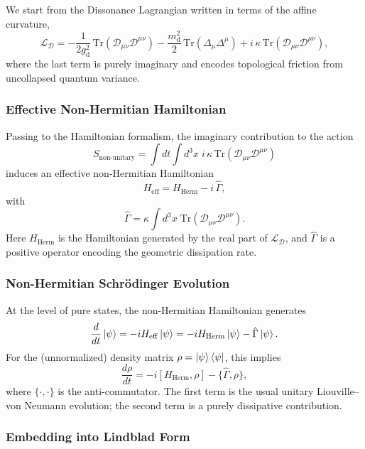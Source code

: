 \documentclass[12pt,openany]{book}
\theoremstyle{plain}
\theoremstyle{definition}
\theoremstyle{remark}
\begin{document}
We start from the Dissonance Lagrangian written in terms of the affine
curvature,
\[
\mathcal{L}_{\mathcal{D}}
=
-\frac{1}{2 g_{\mathrm{d}}^{2}}
\,\mathrm{Tr}\!\left(\mathcal{D}_{\mu\nu}\mathcal{D}^{\mu\nu}\right)
-\frac{m_{\mathrm{d}}^{2}}{2}
\,\mathrm{Tr}\!\left(\Delta_\mu \Delta^\mu\right)
+i\,\kappa\,\mathrm{Tr}\!\left(\mathcal{D}_{\mu\nu}\mathcal{D}^{\mu\nu}\right),
\]
where the last term is purely imaginary and encodes topological friction
from uncollapsed quantum variance.

\subsubsection*{Effective Non-Hermitian Hamiltonian}

Passing to the Hamiltonian formalism, the imaginary contribution to the
action
\[
S_{\mathrm{non\text{-}unitary}}
= \int dt \int d^3x\;
  i\,\kappa\,\mathrm{Tr}\!\left(\mathcal{D}_{\mu\nu}\mathcal{D}^{\mu\nu}\right)
\]
induces an effective non-Hermitian Hamiltonian
\[
H_{\mathrm{eff}}
= H_{\mathrm{Herm}}
- i\,\hat{\Gamma},
\]
with
\[
\hat{\Gamma}
= \kappa \int d^3x\;
  \mathrm{Tr}\!\left(\mathcal{D}_{\mu\nu}\mathcal{D}^{\mu\nu}\right).
\]
Here $H_{\mathrm{Herm}}$ is the Hamiltonian generated by the real part of
$\mathcal{L}_{\mathcal{D}}$, and $\hat{\Gamma}$ is a positive operator
encoding the geometric dissipation rate.

\subsubsection*{Non-Hermitian Schr\"odinger Evolution}

At the level of pure states, the non-Hermitian Hamiltonian generates
\[
\frac{d}{dt}\ket{\psi}
= -i H_{\mathrm{eff}} \ket{\psi}
= -i H_{\mathrm{Herm}} \ket{\psi}
  - \hat{\Gamma} \ket{\psi}.
\]
For the (unnormalized) density matrix $\rho = \ket{\psi}\bra{\psi}$, this
implies
\[
\frac{d\rho}{dt}
= -i[H_{\mathrm{Herm}},\rho]
  - \{\hat{\Gamma},\rho\},
\]
where $\{\cdot,\cdot\}$ is the anti-commutator. The first term is the usual
unitary Liouville–von Neumann evolution; the second term is a purely
dissipative contribution.

\subsubsection*{Embedding into Lindblad Form}
\end{document}
